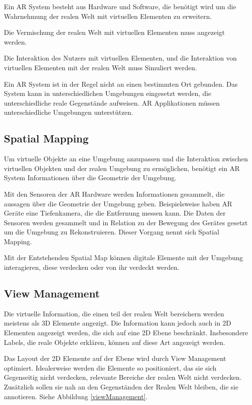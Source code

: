 Ein AR System besteht aus Hardware und Software, die benötigt wird um die Wahrnehmung der realen Welt mit virtuellen Elementen zu erweitern.

Die Vermischung der realen Welt mit virtuellen Elementen muss angezeigt werden.

Die Interaktion des Nutzers mit virtuellen Elementen, und die Interaktion von virtuellen Elementen mit der realen Welt muss Simuliert werden.

Ein AR System ist in der Regel nicht an einen bestimmten Ort gebunden. Das System kann in unterschiedlichen Umgebungen eingesetzt werden, die unterschiedliche reale Gegenstände aufweisen. AR Applikationen müssen unterschiedliche Umgebungen unterstützen.\citep{GrundlagenAR}


\subsection{Spatial Mapping} 
Um virtuelle Objekte an eine Umgebung anzupassen und die Interaktion zwischen virtuellen Objekten und der realen Umgebung zu ermöglichen, benötigt ein AR System Informationen über die Geometrie der Umgebung.

Mit den Sensoren der AR Hardware werden Informationen gesammelt, die aussagen über die Geometrie der Umgebung geben. Beispielsweise haben AR Geräte eine Tiefenkamera, die die Entfernung messen kann. Die Daten der Sensoren werden gesammelt und in Relation zu der Bewegung des Gerätes gesetzt um die Umgebung zu Rekonstruieren. Dieser Vorgang nennt sich Spatial Mapping. 

Mit der Entstehenden Spatial Map können digitale Elemente mit der Umgebung interagieren, diese verdecken oder von ihr verdeckt werden.\citep{spatialMapping} 



\subsection{View Management}
Die virtuelle Information, die einen teil der realen Welt bereichern werden meistens als 3D Elemente angezigt. 
Die Information kann jedoch auch in 2D Elementen angezeigt werden, die sich auf eine 2D Ebene beschränkt. Insbesondere Labels, die reale Objekte erklären, können auf diese Art angezeigt werden.

Das Layout der 2D Elemente auf der Ebene wird durch View Management optimiert.
Idealerweise werden die Elemente so positioniert, das sie sich Gegenseitig nicht verdecken, relevante Bereiche der realen Welt nicht verdecken.
Zusätzlich sollen sie nah an den Gegenständen der Realen Welt bleiben, die sie annotieren. Siehe Abbildung \ref{viewManagement}.

